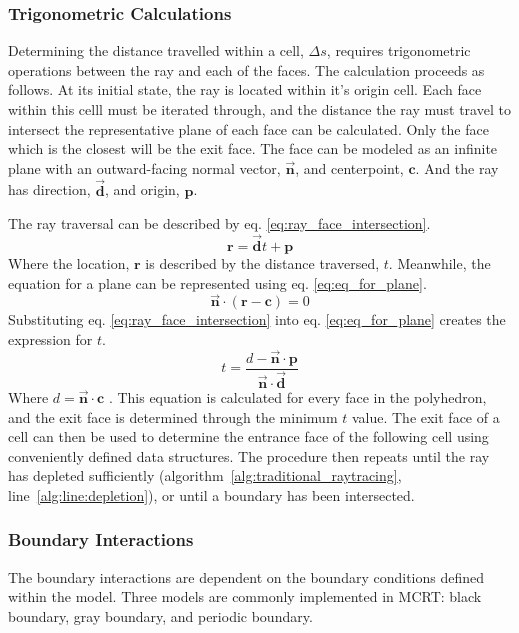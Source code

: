 \subsubsection{Trigonometric Calculations}
Determining the distance travelled within a cell, $\Delta{s}$, requires trigonometric operations between the ray and each of the faces.
The calculation proceeds as follows. At its initial state, the ray is located within it's origin cell. Each face within this celll must be iterated through, and the distance the ray must travel to intersect the representative plane of each face can be calculated. 
Only the face which is the closest will be the exit face. 
The face can be modeled as an infinite plane with an outward-facing normal vector, $\Vec{\textbf{n}}$, and centerpoint, $\textbf{c}$.
And the ray has direction, $\Vec{\textbf{d}}$, and origin, $\textbf{p}$. 


The ray traversal can be described by eq. \ref{eq:ray_face_intersection}.
\begin{equation}
    \textbf{r} = \Vec{\textbf{d}}t + \textbf{p}
    \label{eq:ray_face_intersection}
\end{equation}
Where the location, $\textbf{r}$ is described by the distance traversed, $t$.
Meanwhile, the equation for a plane can be represented using eq. \ref{eq:eq_for_plane}.
\begin{equation}
    \Vec{\textbf{n}} \cdot (\textbf{r} - \textbf{c}) = 0
    \label{eq:eq_for_plane}
\end{equation}
Substituting eq. \ref{eq:ray_face_intersection} into eq. \ref{eq:eq_for_plane} creates the expression for $t$.
\begin{equation}
    t=\frac{d-\Vec{\textbf{n}}\cdot\textbf{p}}{\Vec{\textbf{n}}\cdot\Vec{\textbf{d}}}
    \label{eq:eq_for_plane}
\end{equation}
Where $d=\Vec{\textbf{n}}\cdot\textbf{c}$ \cite{Kay1986RayScenes}. This equation is calculated for every face in the polyhedron, and the exit face is determined through the minimum $t$ value. The exit face of a cell can then be used to determine the entrance face of the following cell using conveniently defined data structures.
The procedure then repeats until the ray has depleted sufficiently (algorithm~\ref{alg:traditional_raytracing}, line~\ref{alg:line:depletion}), or until a boundary has been intersected.

\subsubsection{Boundary Interactions}
The boundary interactions are dependent on the boundary conditions defined within the model. Three models are commonly implemented in MCRT: black boundary, gray boundary, and periodic boundary.

